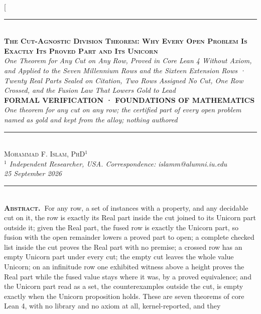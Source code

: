 \documentclass[10pt,twocolumn]{article}
\begin{document}
\twocolumn[{%
\begin{center}
{\color{accent}\rule{0.6\textwidth}{0.8pt}}\\[10pt]
{\bfseries\scshape\fontsize{20}{23}\selectfont The Cut-Agnostic Division
Theorem: Why Every Open Problem Is Exactly Its Proved Part and Its
Unicorn}\\[7pt]
{\itshape\large One Theorem for Any Cut on Any Row, Proved in Core Lean
4 Without Axiom, and Applied to the Seven Millennium Rows and the
Sixteen Extension Rows · Twenty Real Parts Sealed on Citation, Two Rows
Assigned No Cut, One Row Crossed, and the Fusion Law That Lowers Gold to
Lead}\\[8pt]
{\footnotesize\color{accent}\scshape\bfseries FORMAL VERIFICATION ·
FOUNDATIONS OF MATHEMATICS}\\[3pt]
{\itshape\color{deep}\small One theorem for any cut on any row; the
certified part of every open problem named as gold and kept from the
alloy; nothing authored}\\[9pt]
{\color{accent}\rule{0.6\textwidth}{0.8pt}}\\[10pt]
{\scshape Mohammad F. Islam, PhD\(^{1}\)}\\[2pt]
{\itshape\color{faint}\small \(^{1}\) Independent Researcher, USA.
Correspondence: islamm@alumni.iu.edu}\\[2pt]
{\itshape\color{faint}\small 25 September 2026}\\[14pt]
\end{center}
\begin{minipage}{\textwidth}
{\color{accent}\rule{\textwidth}{0.6pt}}\\[4pt]
{\small\hspace{1em}\textbf{\scshape\color{deep}Abstract.\ }For any row,
a set of instances with a property, and any decidable cut on it, the row
is exactly its Real part inside the cut joined to its Unicorn part
outside it; given the Real part, the fused row is exactly the Unicorn
part, so fusion with the open remainder lowers a proved part to open; a
complete checked list inside the cut proves the Real part with no
premise; a crossed row has an empty Unicorn part under every cut; the
empty cut leaves the whole value Unicorn; on an infinitude row one
exhibited witness above a height proves the Real part while the fused
value stays where it was, by a proved equivalence; and the Unicorn part
read as a set, the counterexamples outside the cut, is empty exactly
when the Unicorn proposition holds. These are seven theorems of core
Lean 4, with no library and no axiom at all, kernel-reported, and they
}
\end{minipage}}
\end{document}
